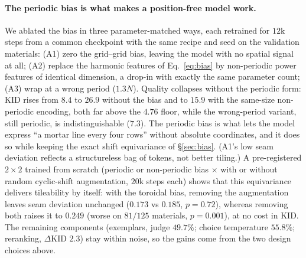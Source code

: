 \documentclass{article}
\begin{document}
\paragraph{The periodic bias is what makes a position-free model work.} We
ablated the bias in three parameter-matched ways, each retrained for $12$k
steps from a common checkpoint with the same recipe and seed on the validation
materials: (A1) zero the grid--grid bias, leaving the model with no spatial
signal at all; (A2) replace the harmonic features of Eq.~\ref{eq:bias} by
non-periodic power features of identical dimension, a drop-in with exactly the
same parameter count; (A3) wrap at a wrong period ($1.3N$). Quality collapses
without the periodic form: KID rises from $8.4$ to $26.9$ without the bias and
to $15.9$ with the same-size non-periodic encoding, both far above the $4.76$
floor, while the wrong-period variant, still periodic, is indistinguishable
($7.3$). The periodic bias is what lets the model express ``a mortar line
every four rows'' without absolute coordinates, and it does so while keeping
the exact shift equivariance of \S\ref{sec:bias}. (A1's low seam deviation
reflects a structureless bag of tokens, not better tiling.) A pre-registered
$2\times2$ trained from scratch (periodic or non-periodic bias $\times$ with or
without random cyclic-shift augmentation, $20$k steps each) shows that this
equivariance delivers tileability by itself: with the toroidal bias, removing
the augmentation leaves seam deviation unchanged ($0.173$ vs $0.185$,
$p=0.72$), whereas removing both raises it to $0.249$ (worse on $81/125$
materials, $p=0.001$), at no cost in KID. The remaining components (exemplars, judge $49.7\%$;
choice temperature $55.8\%$; reranking, $\Delta$KID $2.3$) stay
within noise, so the gains come from the two design choices above.
\end{document}
